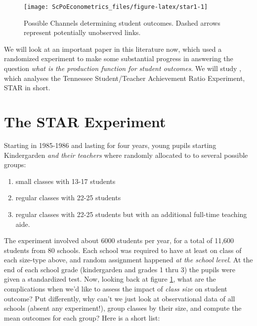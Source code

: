 \documentclass[]{book}
\providecommand{\tightlist}{%
  \setlength{\itemsep}{0pt}\setlength{\parskip}{0pt}}
\begin{document}
\begin{figure}

{\centering \texttt{[image: ScPoEconometrics\_files/figure-latex/star1-1]} 

}

\caption{Possible Channels determining student outcomes. Dashed arrows represent potentially unobserved links.}\label{fig:star1}
\end{figure}

We will look at an important paper in this literature now, which used a randomized experiment to make some substantial progress in answering the question \emph{what is the production function for student outcomes}. We will study \citet{krueger1999}, which analyses the Tennessee Student/Teacher Achievement Ratio Experiment, STAR in short.

\hypertarget{the-star-experiment}{%
\section{The STAR Experiment}\label{the-star-experiment}}

Starting in 1985-1986 and lasting for four years, young pupils starting Kindergarden \emph{and their teachers} where randomly allocated to to several possible groups:

\begin{enumerate}
\def\labelenumi{\arabic{enumi}.}
\tightlist
\item
  small classes with 13-17 students
\item
  regular classes with 22-25 students
\item
  regular classes with 22-25 students but with an additional full-time teaching aide.
\end{enumerate}

The experiment involved about 6000 students per year, for a total of 11,600 students from 80 schools. Each school was required to have at least on class of each size-type above, and random assignment happened \emph{at the school level}. At the end of each school grade (kindergarden and grades 1 thru 3) the pupils were given a standardized test. Now, looking back at figure \ref{fig:star1}, what are the complications when we'd like to assess the impact of \emph{class size} on student outcome? Put differently, why can't we just look at observational data of all schools (absent any experiment!), group classes by their size, and compute the mean outcomes for each group? Here is a short list:
\end{document}
